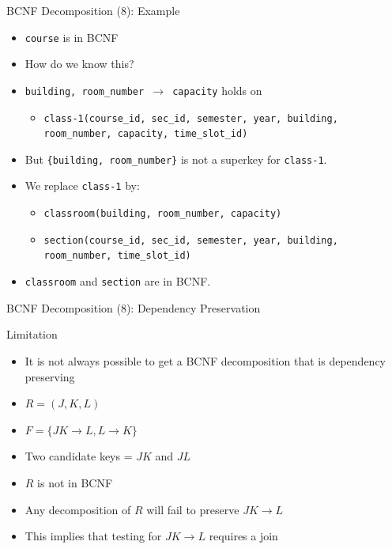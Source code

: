 \documentclass[aspectratio=169, xcolor=dvipsnames]{beamer}
\begin{document}
\begin{frame}{BCNF Decomposition (8): Example}
    \begin{itemize}[<+->]
        \item \texttt{course} is in BCNF
        \item How do we know this?
        \item \texttt{building, room\_number $\rightarrow$ capacity} holds on
        \begin{itemize}
            \item[$\triangleright$] \texttt{class-1(course\_id, sec\_id, semester, year, building, room\_number, capacity, time\_slot\_id)}
        \end{itemize}
        \item But \texttt{\{building, room\_number\}} is not a superkey for \texttt{class-1}.
        \item We replace \texttt{class-1} by:
        \begin{itemize}
            \item[$\triangleright$] \texttt{classroom(building, room\_number, capacity)}
            \item[$\triangleright$] \texttt{section(course\_id, sec\_id, semester, year, building, room\_number, time\_slot\_id)}
        \end{itemize}
        \item \texttt{classroom} and \texttt{section} are in BCNF.
    \end{itemize}
\end{frame}

\begin{frame}{BCNF Decomposition (8): Dependency Preservation}
    \begin{alertblock}{Limitation}
        \begin{itemize}[<+->]
            \item It is not always possible to get a BCNF decomposition that is dependency preserving
            \item $R = (J, K, L)$
            \item $F = \{JK \rightarrow L, L \rightarrow K\}$
            \item Two candidate keys = $JK$ and $JL$
            \item $R$ is not in BCNF
            \item Any decomposition of $R$ will fail to preserve $JK \rightarrow L$
            \item This implies that testing for $JK \rightarrow L$ requires a join
        \end{itemize}
    \end{alertblock}
\end{frame}
\end{document}
